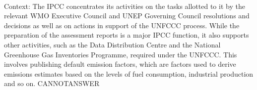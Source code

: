 \documentclass[11pt,a4paper, onecolumn]{article}
\begin{document}
\\ Context: The IPCC concentrates its activities on the tasks allotted to it by the relevant WMO Executive Council and UNEP Governing Council resolutions and decisions as well as on actions in support of the UNFCCC process. While the preparation of the assessment reports is a major IPCC function, it also supports other activities, such as the Data Distribution Centre and the National Greenhouse Gas Inventories Programme, required under the UNFCCC. This involves publishing default emission factors, which are factors used to derive emissions estimates based on the levels of fuel consumption, industrial production and so on. CANNOTANSWER
\end{document}
